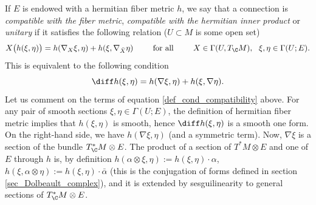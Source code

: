 
If \(E\) is endowed with a hermitian fiber metric \(h\), we say that a connection is \textit{compatible with the fiber metric}, \textit{compatible with the hermitian inner product} or \textit{unitary} if it satisfies the following relation (\(U \subset M\) is some open set)
\[
X \big(h(\xi, \eta) \big)=h(\nabla_X \xi, \eta)+h(\xi , \nabla_{\bar{X}} \eta) \hspace{0.75 cm} \text{ for all } \hspace{0.75 cm} X \in \Gamma(U, T_\C M), \ \ \xi, \eta \in \Gamma(U;E).
\]
This is equivalent to the following condition
\begin{equation} \label{def_cond_compatibility}
\diff h(\xi,\eta)=h(\nabla \xi, \eta) + h(\xi, \nabla \eta).
\end{equation}
Let us comment on the terms of equation \eqref{def_cond_compatibility} above. For any pair of smooth sections \(\xi, \eta \in \Gamma(U;E)\), the definition of hermitian fiber metric implies that \(h(\xi,\eta)\) is smooth, hence \(\diff h(\xi, \eta)\) is a smooth one form. On the right-hand side, we have \(h(\nabla \xi, \eta)\) (and a symmetric term). Now, \(\nabla \xi\) is a section of the bundle \(T^*_\C M \otimes E\). The product of a section of \(T^*M \otimes E\) and one of \(E\) through \(h\) is, by definition \(h(\alpha \otimes \xi, \eta):=h(\xi, \eta) \cdot\alpha\), \(h(\xi, \alpha \otimes \eta):=h(\xi,\eta)\cdot\bar{\alpha}\) (this is the conjugation of forms defined in section \ref{sec_Dolbeault_complex}), and it is extended by sesguilinearity to general sections of \(T^*_\C M \otimes E\).

